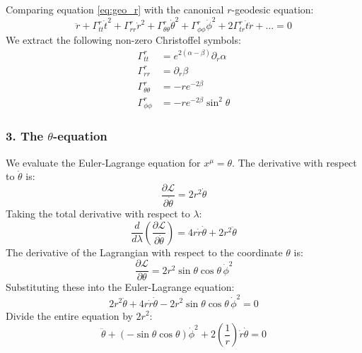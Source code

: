 \documentclass[11pt, a4paper]{report}
\begin{document}
Comparing equation \eqref{eq:geo_r} with the canonical $r$-geodesic equation:
\begin{equation}
    \ddot{r} + \Gamma^r_{tt}\dot{t}^2 + \Gamma^r_{rr}\dot{r}^2 + \Gamma^r_{\theta\theta}\dot{\theta}^2 + \Gamma^r_{\phi\phi}\dot{\phi}^2 + 2\Gamma^r_{tr}\dot{t}\dot{r} + \dots = 0
\end{equation}
We extract the following non-zero Christoffel symbols:
\begin{align}
    \Gamma^r_{tt} &= e^{2(\alpha - \beta)} \partial_r \alpha \\
    \Gamma^r_{rr} &= \partial_r \beta \\
    \Gamma^r_{\theta\theta} &= -r e^{-2\beta} \\
    \Gamma^r_{\phi\phi} &= -r e^{-2\beta} \sin^2\theta
\end{align}

\subsubsection*{3. The $\theta$-equation}

We evaluate the Euler-Lagrange equation for $x^\mu = \theta$.
The derivative with respect to $\dot{\theta}$ is:
\begin{equation}
    \frac{\partial \mathcal{L}}{\partial \dot{\theta}} = 2r^2 \dot{\theta}
\end{equation}
Taking the total derivative with respect to $\lambda$:
\begin{equation}
    \frac{d}{d\lambda} \left( \frac{\partial \mathcal{L}}{\partial \dot{\theta}} \right) = 4r\dot{r}\dot{\theta} + 2r^2 \ddot{\theta}
\end{equation}
The derivative of the Lagrangian with respect to the coordinate $\theta$ is:
\begin{equation}
    \frac{\partial \mathcal{L}}{\partial \theta} = 2r^2 \sin\theta \cos\theta \, \dot{\phi}^2
\end{equation}
Substituting these into the Euler-Lagrange equation:
\begin{equation}
    2r^2 \ddot{\theta} + 4r\dot{r}\dot{\theta} - 2r^2 \sin\theta \cos\theta \, \dot{\phi}^2 = 0
\end{equation}
Divide the entire equation by $2r^2$:
\begin{equation}
    \ddot{\theta} + (-\sin\theta \cos\theta) \dot{\phi}^2 + 2 \left(\frac{1}{r}\right) \dot{r}\dot{\theta} = 0 \label{eq:geo_theta}
\end{equation}
\end{document}
